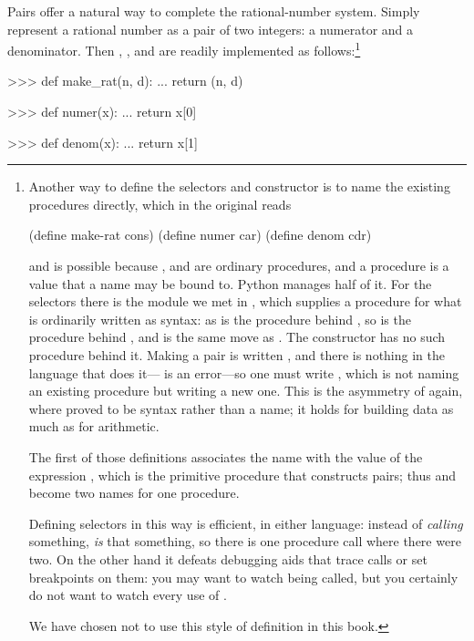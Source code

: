 Pairs offer a natural way to complete the rational-number system.  Simply
represent a rational number as a pair of two integers: a numerator and a
denominator.  Then , , and  are readily
implemented as follows:\footnote{Another way to define the selectors and
constructor is to name the existing procedures directly, which in the original
reads

\begin{compactCodeBlock}
(define make-rat cons)
(define numer car)
(define denom cdr)
\end{compactCodeBlock}

and is possible because ,  and  are ordinary
procedures, and a procedure is a value that a name may be bound to.  Python
manages half of it.  For the selectors there is the  module we
met in , which supplies a procedure for what is ordinarily
written as syntax: as  is the procedure behind \code{+}, so
 is the procedure behind , and
 is the same move as
.  The constructor has no such procedure behind it.
Making a pair is written , and there is nothing in the language
that does it--- is an error---so one must write
, which is not naming an existing
procedure but writing a new one.  This is the asymmetry of
 again, where \code{+} proved to be syntax rather than a
name; it holds for building data as much as for arithmetic.

The first of those definitions associates the name  with the
value of the expression , which is the primitive procedure that
constructs pairs; thus  and  become two names for one
procedure.

Defining selectors in this way is efficient, in either language: instead of
 \emph{calling} something,  \emph{is} that something,
so there is one procedure call where there were two.  On the other hand it
defeats debugging aids that trace calls or set breakpoints on them: you may
want to watch  being called, but you certainly do not want to watch
every use of .

We have chosen not to use this style of definition in this book.}

\begin{codeBlock}
>>> def make_rat(n, d):
...     return (n, d)

>>> def numer(x):
...     return x[0]

>>> def denom(x):
...     return x[1]
\end{codeBlock}

